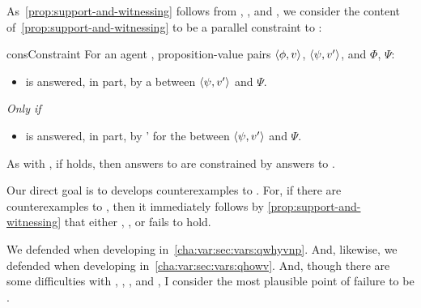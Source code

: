 \begin{note}
  As~\autoref{prop:support-and-witnessing} follows from \linkW{}, \linkH{}, and \issueInclusion{}, we consider the content of~\autoref{prop:support-and-witnessing} to be a parallel constraint to \issueInclusion{}:

  \begin{constraint}{consConstraint}{\issueConstraint{}}
    For an agent \vAgent{}, proposition-value pairs \(\langle \phi, v \rangle\), \(\langle \psi, v' \rangle\), and  \(\Phi\), \(\Psi\):

    \begin{itemize}
    \item
      \qWhyV{} is answered, in part, by a \ros{} between \(\langle \psi, v' \rangle\) and \(\Psi\).
    \end{itemize}

    \emph{Only if}

    \begin{itemize}
    \item
      \qHowV{} is answered, in part, by \vAgent{}'  for the \ros{} between \(\langle \psi, v' \rangle\) and \(\Psi\).
    \end{itemize}
    \vspace{-\baselineskip}
  \end{constraint}

  As with \issueInclusion{}, if \issueConstraint{} holds, then answers to \qWhyV{} are constrained by answers to \qHowV{}.

  Our direct goal is to develops counterexamples to \issueConstraint{}.
  For, if there are counterexamples to \issueConstraint{}, then it immediately follows by \autoref{prop:support-and-witnessing} that either \linkW{}, \linkH{}, or \issueInclusion{} fails to hold.

  We defended \linkW{} when developing \qWhyV{} in~\autoref{cha:var:sec:vars:qwhyvnp}.
  And, likewise, we defended \linkH{} when developing \qHowV{} in~\autoref{cha:var:sec:vars:qhowv}.
  And, though there are some difficulties with \qWhyV{}, \qHowV{}, \linkW{}, and \linkH{}, I consider the most plausible point of failure to be \issueInclusion{}.
\end{note}


